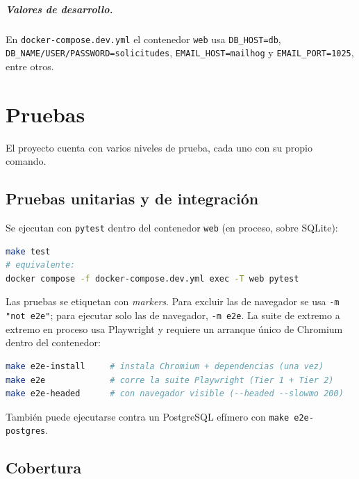 \documentclass[12pt,letterpaper]{report}
\begin{document}
\paragraph{Valores de desarrollo.} En \texttt{docker-compose.dev.yml} el contenedor
\texttt{web} usa \texttt{DB\_HOST=db}, \texttt{DB\_NAME/USER/PASSWORD=solicitudes},
\texttt{EMAIL\_HOST=mailhog} y \texttt{EMAIL\_PORT=1025}, entre otros.

\chapter{Pruebas}

El proyecto cuenta con varios niveles de prueba, cada uno con su propio comando.

\section{Pruebas unitarias y de integración}

Se ejecutan con \texttt{pytest} dentro del contenedor \texttt{web} (en proceso,
sobre SQLite):

\begin{lstlisting}[language=bash]
make test
# equivalente:
docker compose -f docker-compose.dev.yml exec -T web pytest
\end{lstlisting}

Las pruebas se etiquetan con \emph{markers}. Para excluir las de navegador se usa
\texttt{-m "not e2e"}; para ejecutar solo las de navegador, \texttt{-m e2e}. La
suite de extremo a extremo en proceso usa Playwright y requiere un arranque único
de Chromium dentro del contenedor:

\begin{lstlisting}[language=bash]
make e2e-install     # instala Chromium + dependencias (una vez)
make e2e             # corre la suite Playwright (Tier 1 + Tier 2)
make e2e-headed      # con navegador visible (--headed --slowmo 200)
\end{lstlisting}

También puede ejecutarse contra un PostgreSQL efímero con
\texttt{make e2e-postgres}.

\section{Cobertura}
\end{document}
